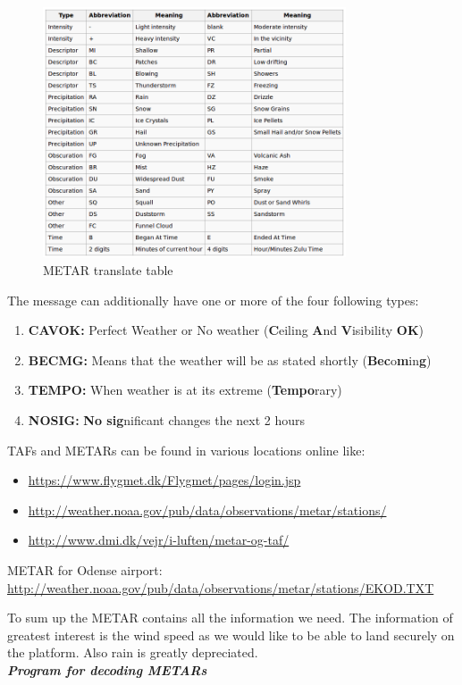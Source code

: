 \begin{figure}
	\centering
	\includegraphics[width=0.8\textwidth]{imgs/metar_table}
	\caption{METAR translate table}
	\label{fig:metar_table}
\end{figure}

The message can additionally have one or more of the four following types:
\begin{enumerate}
	\item \textbf{CAVOK:} Perfect Weather or No weather (\textbf{C}eiling \textbf{A}nd \textbf{V}isibility \textbf{OK})
	\item \textbf{BECMG:}	Means that the weather will be as stated shortly (\textbf{Bec}o\textbf{m}in\textbf{g})
	\item \textbf{TEMPO:} When weather is at its extreme (\textbf{Tempo}rary)
	\item \textbf{NOSIG:} \textbf{No sig}nificant changes the next 2 hours
\end{enumerate}

TAFs and METARs can be found in various locations online like:
\begin{itemize}
	\item \url{https://www.flygmet.dk/Flygmet/pages/login.jsp}
	\item \url{http://weather.noaa.gov/pub/data/observations/metar/stations/}
	\item \url{http://www.dmi.dk/vejr/i-luften/metar-og-taf/}
\end{itemize}




METAR for Odense airport:
\url{http://weather.noaa.gov/pub/data/observations/metar/stations/EKOD.TXT}


To sum up the METAR contains all the information we need. The information of greatest interest is the wind speed as we would like to be able to land securely on the platform. Also rain is greatly depreciated.\\
\emph{\textbf{Program for decoding METARs}}

